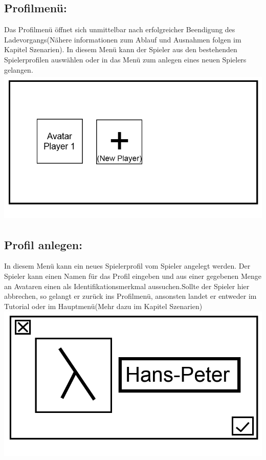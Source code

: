 \documentclass{scrartcl}
\begin{document}
\begin{enumerate}
	\begin{minipage}{1\textwidth}
		\item \subsection*{Profilmenü:}
		Das Profilmenü öffnet sich unmittelbar nach erfolgreicher Beendigung des Ladevorgangs(Nähere informationen zum Ablauf und Ausnahmen folgen im Kapitel Szenarien).
		In diesem Menü kann der Spieler aus den bestehenden Spielerprofilen auswählen oder in das Menü zum anlegen eines neuen Spielers gelangen.\\
		\includegraphics[width=\textwidth, height=7.5cm]{assets/PlayerScreen}
	\end{minipage}
	
	\begin{minipage}{1\textwidth}
		\item \subsection*{Profil anlegen:}
		In diesem Menü kann ein neues Spielerprofil vom Spieler angelegt werden. Der Spieler kann einen Namen für das Profil eingeben und aus einer gegebenen Menge an Avataren einen als Identifikationsmerkmal aussuchen.Sollte der Spieler hier abbrechen, so gelangt er zurück ins Profilmenü, ansonsten landet er entweder im Tutorial oder im Hauptmenü(Mehr dazu im Kapitel Szenarien)\\
		\includegraphics[width=\textwidth, height=7.5cm]{assets/CreateProfile}
	\end{minipage}
	

\end{enumerate}
\end{document}
